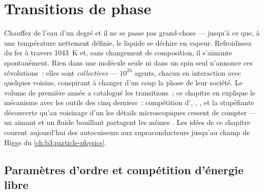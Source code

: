 \chapter{Transitions de phase}\label{ch:b3:phase-transitions}

Chauffez de l'eau d'un degré et il ne se passe pas grand-chose ---
jusqu'à ce que, à une température nettement définie, le liquide se
déchire en vapeur. Refroidissez du fer à travers \qty{1043}{K} et,
sans changement de composition, il s'aimante spontanément. Rien dans
une molécule seule ni dans un spin seul n'annonce ces révolutions~:
elles sont \emph{collectives} --- $10^{23}$ agents, chacun en
interaction avec quelques voisins, conspirant à changer d'un coup la
phase de leur société. Le volume de première année a catalogué les
transitions~; ce chapitre en explique le mécanisme avec les outils
des cinq derniers~: compétition d', ,
, et la stupéfiante découverte qu'au voisinage
d'un  les détails microscopiques cessent de compter
--- un aimant et un fluide bouillant partagent les mêmes . Les idées de ce chapitre courent aujourd'hui des
autocuiseurs aux supraconducteurs jusqu'au champ de Higgs du
\cref{ch:b3:particle-physics}.

\section{Paramètres d'ordre et compétition d'énergie libre}

